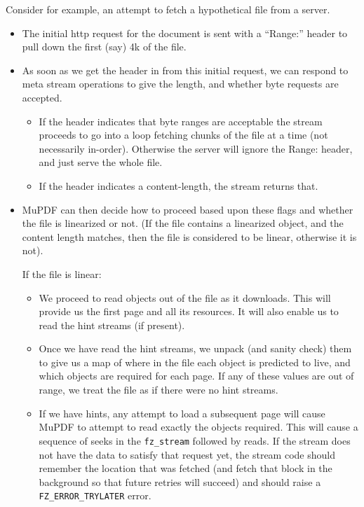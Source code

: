 \documentclass[oneside]{book}
\begin{document}
Consider for example, an attempt to fetch a hypothetical file from a server.

\begin{itemize}

\item
The initial http request for the document is sent with a ``Range:'' header to pull down the first (say) 4k of the file.

\item
As soon as we get the header in from this initial request, we can respond to meta stream operations to give the length, and whether byte requests are accepted.

\begin{itemize}
\item
If the header indicates that byte ranges are acceptable the stream proceeds to go into a loop fetching chunks of the file at a time (not necessarily in-order). Otherwise the server will ignore the Range: header, and just serve the whole file.

\item
If the header indicates a content-length, the stream returns that.
\end{itemize}

\item
MuPDF can then decide how to proceed based upon these flags and whether the file is linearized or not. (If the file contains a linearized object, and the content length matches, then the file is considered to be linear, otherwise it is not).

If the file is linear:

\begin{itemize}
\item
We proceed to read objects out of the file as it downloads. This will provide us the first page and all its resources. It will also enable us to read the hint streams (if present).

\item
Once we have read the hint streams, we unpack (and sanity check) them to give us a map of where in the file each object is predicted to live, and which objects are required for each page. If any of these values are out of range, we treat the file as if there were no hint streams.

\item
If we have hints, any attempt to load a subsequent page will cause MuPDF to attempt to read exactly the objects required. This will cause a sequence of seeks in the \texttt{fz\_stream} followed by reads. If the stream does not have the data to satisfy that request yet, the stream code should remember the location that was fetched (and fetch that block in the background so that future retries will succeed) and should raise a \texttt{FZ\_ERROR\_TRYLATER} error.


\end{itemize}
\end{itemize}
\end{document}
